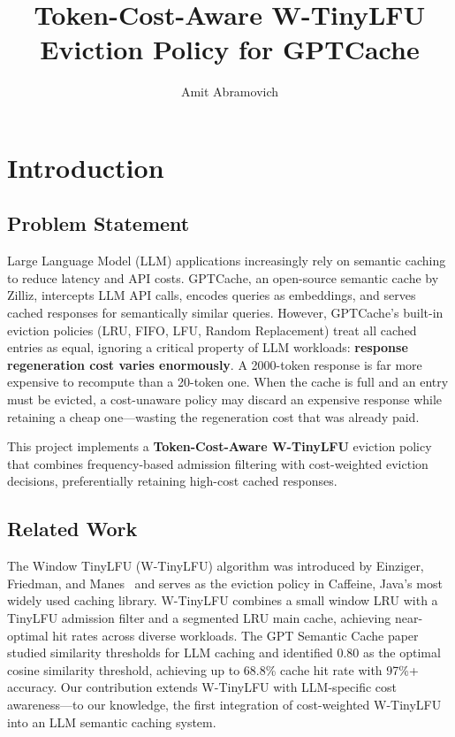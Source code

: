 \documentclass[11pt,a4paper]{article}
\title{\textbf{Token-Cost-Aware W-TinyLFU Eviction Policy for GPTCache}}
\author{Amit Abramovich}
\date{}
\begin{document}
\maketitle

\tableofcontents
\newpage

\section{Introduction}

\subsection{Problem Statement}

Large Language Model (LLM) applications increasingly rely on semantic caching to reduce latency and API costs.
GPTCache, an open-source semantic cache by Zilliz, intercepts LLM API calls, encodes queries as embeddings, and serves cached responses for semantically similar queries.
However, GPTCache's built-in eviction policies (LRU, FIFO, LFU, Random Replacement) treat all cached entries as equal, ignoring a critical property of LLM workloads: \textbf{response regeneration cost varies enormously}.
A 2000-token response is far more expensive to recompute than a 20-token one.
When the cache is full and an entry must be evicted, a cost-unaware policy may discard an expensive response while retaining a cheap one---wasting the regeneration cost that was already paid.

This project implements a \textbf{Token-Cost-Aware W-TinyLFU} eviction policy that combines frequency-based admission filtering with cost-weighted eviction decisions, preferentially retaining high-cost cached responses.

\subsection{Related Work}

The Window TinyLFU (W-TinyLFU) algorithm was introduced by Einziger, Friedman, and Manes~\cite{tinylfu} and serves as the eviction policy in Caffeine, Java's most widely used caching library.
W-TinyLFU combines a small window LRU with a TinyLFU admission filter and a segmented LRU main cache, achieving near-optimal hit rates across diverse workloads.
The GPT Semantic Cache paper~\cite{gptsemcache} studied similarity thresholds for LLM caching and identified 0.80 as the optimal cosine similarity threshold, achieving up to 68.8\% cache hit rate with 97\%+ accuracy.
Our contribution extends W-TinyLFU with LLM-specific cost awareness---to our knowledge, the first integration of cost-weighted W-TinyLFU into an LLM semantic caching system.
\end{document}
